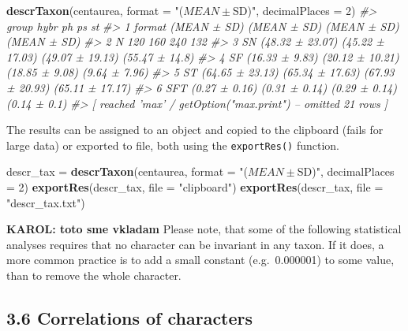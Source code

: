 \documentclass[
]{article}
\newenvironment{Shaded}{\begin{snugshade}}{\end{snugshade}}
\newcommand{\CommentTok}[1]{\textcolor[rgb]{0.56,0.35,0.01}{\textit{#1}}}
\newcommand{\DataTypeTok}[1]{\textcolor[rgb]{0.13,0.29,0.53}{#1}}
\newcommand{\DecValTok}[1]{\textcolor[rgb]{0.00,0.00,0.81}{#1}}
\newcommand{\KeywordTok}[1]{\textcolor[rgb]{0.13,0.29,0.53}{\textbf{#1}}}
\newcommand{\NormalTok}[1]{#1}
\newcommand{\StringTok}[1]{\textcolor[rgb]{0.31,0.60,0.02}{#1}}
\begin{document}
\begin{Shaded}
\begin{Highlighting}[]
\KeywordTok{descrTaxon}\NormalTok{(centaurea, }\DataTypeTok{format =} \StringTok{"($MEAN ± $SD)"}\NormalTok{, }\DataTypeTok{decimalPlaces =} \DecValTok{2}\NormalTok{)}
\CommentTok{#>    group            hybr              ph              ps              st}
\CommentTok{#> 1 format     (MEAN ± SD)     (MEAN ± SD)     (MEAN ± SD)     (MEAN ± SD)}
\CommentTok{#> 2      N             120             160             240             132}
\CommentTok{#> 3     SN (48.32 ± 23.07) (45.22 ± 17.03) (49.07 ± 19.13)  (55.47 ± 14.8)}
\CommentTok{#> 4     SF  (16.33 ± 9.83) (20.12 ± 10.21)  (18.85 ± 9.08)   (9.64 ± 7.96)}
\CommentTok{#> 5     ST (64.65 ± 23.13) (65.34 ± 17.63) (67.93 ± 20.93) (65.11 ± 17.17)}
\CommentTok{#> 6    SFT   (0.27 ± 0.16)   (0.31 ± 0.14)   (0.29 ± 0.14)    (0.14 ± 0.1)}
\CommentTok{#>  [ reached 'max' / getOption("max.print") -- omitted 21 rows ]}
\end{Highlighting}
\end{Shaded}

The results can be assigned to an object and copied to the clipboard
(fails for large data) or exported to file, both using the
\texttt{exportRes()} function.

\begin{Shaded}
\begin{Highlighting}[]
\NormalTok{descr_tax =}\StringTok{ }\KeywordTok{descrTaxon}\NormalTok{(centaurea, }\DataTypeTok{format =} \StringTok{"($MEAN ± $SD)"}\NormalTok{, }\DataTypeTok{decimalPlaces =} \DecValTok{2}\NormalTok{)}
\KeywordTok{exportRes}\NormalTok{(descr_tax, }\DataTypeTok{file =} \StringTok{"clipboard"}\NormalTok{)}
\KeywordTok{exportRes}\NormalTok{(descr_tax, }\DataTypeTok{file =} \StringTok{"descr_tax.txt"}\NormalTok{)}
\end{Highlighting}
\end{Shaded}

\textbf{KAROL: toto sme vkladam} Please note, that some of the following
statistical analyses requires that no character can be invariant in any
taxon. If it does, a more common practice is to add a small constant
(e.g.~0.000001) to some value, than to remove the whole character.

\hypertarget{correlations-of-characters}{%
\subsection{3.6 Correlations of
characters}\label{correlations-of-characters}}
\end{document}
